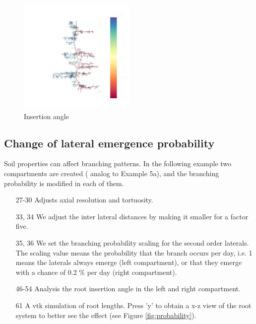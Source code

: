 \begin{figure}
\centering
\includegraphics[width=0.5\textwidth]{example5c.png}
\caption{Insertion angle} \label{fig:insertion}
\end{figure}


\subsection{Change of lateral emergence probability} \label{sec:branching}

Soil properties can affect branching patterns. In the following example two compartments are created ( analog to Example 5a), and the branching probability is modified in each of them.



\begin{itemize}

\item[27-30] Adjusts axial resolution and tortuosity.

\item[33, 34] We adjust the inter lateral distances by making it smaller for a factor five.

\item[35, 36] We set the branching probability scaling for the second order laterals. The scaling value means the probability that the branch occurs per day, i.e. 1 means the laterals always emerge (left compartment), or that they emerge with a chance of 0.2 \% per day (right compartment). 

\item[46-54] Analysis the root insertion angle in the left and right compartment. 

\item[61] A vtk simulation of root lengths. Press 'y' to obtain a x-z view of the root system to better see the effect (see Figure \ref{fig:probability}). 

\end{itemize}

